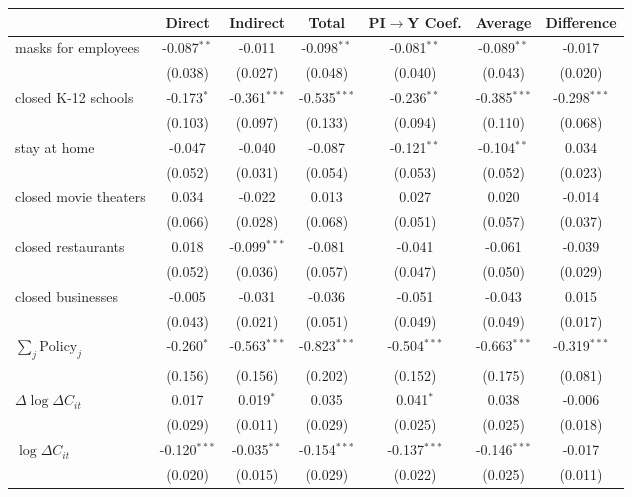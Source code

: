 
\begin{tabular}{lccccc|>{}c}
\toprule
  & Direct & Indirect & Total & PI$\to$Y Coef. & Average & Difference\\
\midrule
masks for employees & -0.087$^{**}$ & -0.011 & -0.098$^{**}$ & -0.081$^{**}$ & -0.089$^{**}$ & -0.017\\
 & (0.038) & (0.027) & (0.048) & (0.040) & (0.043) & (0.020)\\
closed K-12 schools & -0.173$^{*}$ & -0.361$^{***}$ & -0.535$^{***}$ & -0.236$^{**}$ & -0.385$^{***}$ & -0.298$^{***}$\\
 & (0.103) & (0.097) & (0.133) & (0.094) & (0.110) & (0.068)\\
stay at home & -0.047 & -0.040 & -0.087 & -0.121$^{**}$ & -0.104$^{**}$ & 0.034\\
 & (0.052) & (0.031) & (0.054) & (0.053) & (0.052) & (0.023)\\
closed movie theaters & 0.034 & -0.022 & 0.013 & 0.027 & 0.020 & -0.014\\
 & (0.066) & (0.028) & (0.068) & (0.051) & (0.057) & (0.037)\\
closed restaurants & 0.018 & -0.099$^{***}$ & -0.081 & -0.041 & -0.061 & -0.039\\
 & (0.052) & (0.036) & (0.057) & (0.047) & (0.050) & (0.029)\\
closed businesses & -0.005 & -0.031 & -0.036 & -0.051 & -0.043 & 0.015\\
 & (0.043) & (0.021) & (0.051) & (0.049) & (0.049) & (0.017)\\
$\sum_j \mathrm{Policy}_j$ & -0.260$^{*}$ & -0.563$^{***}$ & -0.823$^{***}$ & -0.504$^{***}$ & -0.663$^{***}$ & -0.319$^{***}$\\
 & (0.156) & (0.156) & (0.202) & (0.152) & (0.175) & (0.081)\\
$\Delta \log \Delta C_{it}$ & 0.017 & 0.019$^{*}$ & 0.035 & 0.041$^{*}$ & 0.038 & -0.006\\
 & (0.029) & (0.011) & (0.029) & (0.025) & (0.025) & (0.018)\\
$\log \Delta C_{it}$ & -0.120$^{***}$ & -0.035$^{**}$ & -0.154$^{***}$ & -0.137$^{***}$ & -0.146$^{***}$ & -0.017\\
 & (0.020) & (0.015) & (0.029) & (0.022) & (0.025) & (0.011)\\
\bottomrule
\end{tabular}